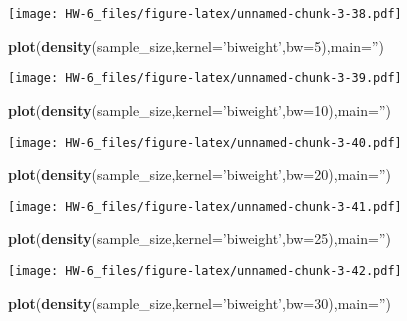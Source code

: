 \documentclass[]{article}
\newenvironment{Shaded}{\begin{snugshade}}{\end{snugshade}}
\newcommand{\DataTypeTok}[1]{\textcolor[rgb]{0.13,0.29,0.53}{#1}}
\newcommand{\DecValTok}[1]{\textcolor[rgb]{0.00,0.00,0.81}{#1}}
\newcommand{\KeywordTok}[1]{\textcolor[rgb]{0.13,0.29,0.53}{\textbf{#1}}}
\newcommand{\NormalTok}[1]{#1}
\newcommand{\StringTok}[1]{\textcolor[rgb]{0.31,0.60,0.02}{#1}}
\begin{document}
\texttt{[image: HW-6\_files/figure-latex/unnamed-chunk-3-38.pdf]}

\begin{Shaded}
\begin{Highlighting}[]
\KeywordTok{plot}\NormalTok{(}\KeywordTok{density}\NormalTok{(sample_size,}\DataTypeTok{kernel=}\StringTok{'biweight'}\NormalTok{,}\DataTypeTok{bw=}\DecValTok{5}\NormalTok{),}\DataTypeTok{main=}\StringTok{''}\NormalTok{)}
\end{Highlighting}
\end{Shaded}

\texttt{[image: HW-6\_files/figure-latex/unnamed-chunk-3-39.pdf]}

\begin{Shaded}
\begin{Highlighting}[]
\KeywordTok{plot}\NormalTok{(}\KeywordTok{density}\NormalTok{(sample_size,}\DataTypeTok{kernel=}\StringTok{'biweight'}\NormalTok{,}\DataTypeTok{bw=}\DecValTok{10}\NormalTok{),}\DataTypeTok{main=}\StringTok{''}\NormalTok{)}
\end{Highlighting}
\end{Shaded}

\texttt{[image: HW-6\_files/figure-latex/unnamed-chunk-3-40.pdf]}

\begin{Shaded}
\begin{Highlighting}[]
\KeywordTok{plot}\NormalTok{(}\KeywordTok{density}\NormalTok{(sample_size,}\DataTypeTok{kernel=}\StringTok{'biweight'}\NormalTok{,}\DataTypeTok{bw=}\DecValTok{20}\NormalTok{),}\DataTypeTok{main=}\StringTok{''}\NormalTok{)}
\end{Highlighting}
\end{Shaded}

\texttt{[image: HW-6\_files/figure-latex/unnamed-chunk-3-41.pdf]}

\begin{Shaded}
\begin{Highlighting}[]
\KeywordTok{plot}\NormalTok{(}\KeywordTok{density}\NormalTok{(sample_size,}\DataTypeTok{kernel=}\StringTok{'biweight'}\NormalTok{,}\DataTypeTok{bw=}\DecValTok{25}\NormalTok{),}\DataTypeTok{main=}\StringTok{''}\NormalTok{)}
\end{Highlighting}
\end{Shaded}

\texttt{[image: HW-6\_files/figure-latex/unnamed-chunk-3-42.pdf]}

\begin{Shaded}
\begin{Highlighting}[]
\KeywordTok{plot}\NormalTok{(}\KeywordTok{density}\NormalTok{(sample_size,}\DataTypeTok{kernel=}\StringTok{'biweight'}\NormalTok{,}\DataTypeTok{bw=}\DecValTok{30}\NormalTok{),}\DataTypeTok{main=}\StringTok{''}\NormalTok{)}
\end{Highlighting}
\end{Shaded}
\end{document}
